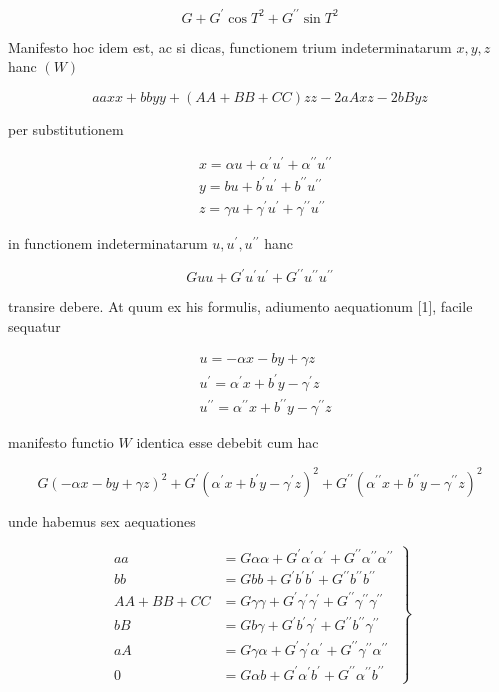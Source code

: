 \documentclass[10pt]{article}
\begin{document}
\[
G+G^{\prime} \cos T^{2}+G^{\prime \prime} \sin T^{2}
\]

Manifesto hoc idem est, ac si dicas, functionem trium indeterminatarum \(x, y, z\) hanc \((W)\)

\[
a a x x+b b y y+(A A+B B+C C) z z-2 a A x z-2 b B y z
\]

per substitutionem

\[
\begin{aligned}
& x=\alpha u+\alpha^{\prime} u^{\prime}+\alpha^{\prime \prime} u^{\prime \prime} \\
& y=b u+b^{\prime} u^{\prime}+b^{\prime \prime} u^{\prime \prime} \\
& z=\gamma u+\gamma^{\prime} u^{\prime}+\gamma^{\prime \prime} u^{\prime \prime}
\end{aligned}
\]

in functionem indeterminatarum \(u, u^{\prime}, u^{\prime \prime}\) hanc

\[
G u u+G^{\prime} u^{\prime} u^{\prime}+G^{\prime \prime} u^{\prime \prime} u^{\prime \prime}
\]

transire debere. At quum ex his formulis, adiumento aequationum [1], facile sequatur

\[
\begin{aligned}
& u=-\alpha x-b y+\gamma z \\
& u^{\prime}=\alpha^{\prime} x+b^{\prime} y-\gamma^{\prime} z \\
& u^{\prime \prime}=\alpha^{\prime \prime} x+b^{\prime \prime} y-\gamma^{\prime \prime} z
\end{aligned}
\]

manifesto functio \(W\) identica esse debebit cum hac

\[
G(-\alpha x-b y+\gamma z)^{2}+G^{\prime}\left(\alpha^{\prime} x+b^{\prime} y-\gamma^{\prime} z\right)^{2}+G^{\prime \prime}\left(\alpha^{\prime \prime} x+b^{\prime \prime} y-\gamma^{\prime \prime} z\right)^{2}
\]

unde habemus sex aequationes

\[
\left.\begin{array}{rl}
a a & =G \alpha \alpha+G^{\prime} \alpha^{\prime} \alpha^{\prime}+G^{\prime \prime} \alpha^{\prime \prime} \alpha^{\prime \prime} \\
b b & =G b b+G^{\prime} b^{\prime} b^{\prime}+G^{\prime \prime} b^{\prime \prime} b^{\prime \prime} \\
A A+B B+C C & =G \gamma \gamma+G^{\prime} \gamma^{\prime} \gamma^{\prime}+G^{\prime \prime} \gamma^{\prime \prime} \gamma^{\prime \prime} \\
b B & =G b \gamma+G^{\prime} b^{\prime} \gamma^{\prime}+G^{\prime \prime} b^{\prime \prime} \gamma^{\prime \prime} \\
a A & =G \gamma \alpha+G^{\prime} \gamma^{\prime} \alpha^{\prime}+G^{\prime \prime} \gamma^{\prime \prime} \alpha^{\prime \prime} \\
0 & =G \alpha b+G^{\prime} \alpha^{\prime} b^{\prime}+G^{\prime \prime} \alpha^{\prime \prime} b^{\prime \prime}
\end{array}\right\}
\]
\end{document}
